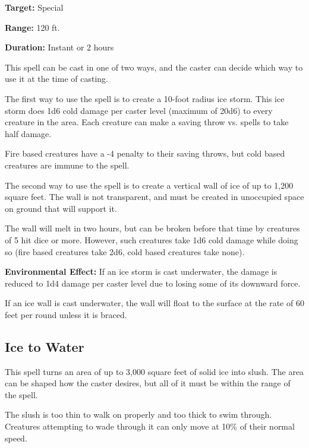 \begin{multicols*}{2}
{\textbf{Target:} Special

\textbf{Range:} 120 ft.

\textbf{Duration:} Instant or 2 hours}

This spell can be cast in one of two ways, and the caster can decide which way to use it at the time of casting.

The first way to use the spell is to create a 10-foot radius ice storm. This ice storm does 1d6 cold damage per caster level (maximum of 20d6) to every creature in the area. Each creature can make a saving throw vs. spells to take half damage.

Fire based creatures have a -4 penalty to their saving throws, but cold based creatures are immune to the spell.

The second way to use the spell is to create a vertical wall of ice of up to 1,200 square feet. The wall is not transparent, and must be created in unoccupied space on ground that will support it.

The wall will melt in two hours, but can be broken before that time by creatures of 5 hit dice or more. However, such creatures take 1d6 cold damage while doing so (fire based creatures take 2d6, cold based creatures take none).

\textbf{Environmental Effect:} If an ice storm is cast underwater, the damage is reduced to 1d4 damage per caster level due to losing some of its downward force.

If an ice wall is cast underwater, the wall will float to the surface at the rate of 60 feet per round unless it is braced.

\subsection{Ice to Water}\label{spell:Ice to Water}

This spell turns an area of up to 3,000 square feet of solid ice into slush. The area can be shaped how the caster desires, but all of it must be within the range of the spell.

The slush is too thin to walk on properly and too thick to swim through. Creatures attempting to wade through it can only move at 10\% of their normal speed.


\end{multicols*}
